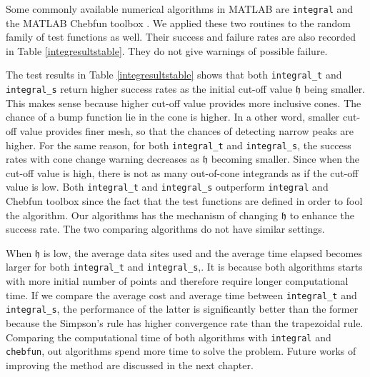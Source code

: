 \documentclass{iitthesis}
\theoremstyle{definition}
\theoremstyle{remark}
\begin{document}
Some commonly available numerical algorithms in MATLAB are {\tt integral} \cite{MAT9.3} and the MATLAB Chebfun toolbox \cite{TrefEtal12}. We applied these two routines to the random family of test functions as well.  Their success and failure rates are also recorded in Table \ref{integresultstable}.  They do not give warnings of possible failure.

The test results in Table \ref{integresultstable} shows that both {\tt integral\_t} and {\tt integral\_s} return higher success rates as the initial cut-off value $\mathfrak{h}$ being smaller. This makes sense because higher cut-off value provides more inclusive cones. The chance of a bump function lie in the cone is higher. In a other word, smaller cut-off value provides finer mesh, so that the chances of detecting narrow peaks are higher. For the same reason, for both {\tt integral\_t} and {\tt integral\_s}, the success rates with cone change warning decreases as $\mathfrak{h}$ becoming smaller. Since when the cut-off value is high, there is not as many out-of-cone integrands as if the cut-off value is low. Both {\tt integral\_t} and {\tt integral\_s} outperform {\tt integral} and Chebfun toolbox since the fact that the test functions are defined in order to fool the algorithm. Our algorithms has the mechanism of changing $\mathfrak{h}$ to enhance the success rate. The two comparing algorithms do not have similar settings.

When $\mathfrak{h}$ is low, the average data sites used and the average time elapsed becomes larger for both {\tt integral\_t} and {\tt integral\_s},. It is because both algorithms starts with more initial number of points and therefore require longer computational time. If we compare the average cost and average time between {\tt integral\_t} and {\tt integral\_s}, the performance of the latter is significantly better than the former because the Simpson's rule has higher convergence rate than the trapezoidal rule. Comparing the computational time of both algorithms with {\tt integral} and {\tt chebfun}, out algorithms spend more time to solve the problem. Future works of improving the method are discussed in the next chapter.
\end{document}
